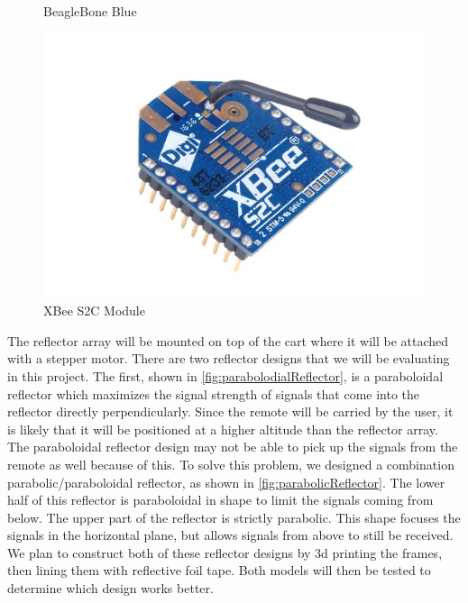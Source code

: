 \begin{figure}
\begin{minipage}[t]{0.32\textwidth}
    \captionsetup{width=\textwidth}
    \caption{BeagleBone Blue}
    \label{fig:beagleboneBlue}
  \end{minipage}
  \begin{minipage}[t]{0.32\textwidth}
    \includegraphics[width=1\textwidth]{figs/img/Xbee-S2C-Module}
    \captionsetup{width=\textwidth}
    \caption{XBee S2C Module}
    \label{fig:XBeeModule}
  \end{minipage}
\end{figure}

\vspace*{12pt}
\noindent
The reflector array will be mounted on top of the cart where it will be attached with a stepper motor. There are two reflector designs that we will be evaluating in this project. The first, shown in \autoref{fig:parabolodialReflector}, is a paraboloidal reflector which maximizes the signal strength of signals that come into the reflector directly perpendicularly. Since the remote will be carried by the user, it is likely that it will be positioned at a higher altitude than the reflector array. The paraboloidal reflector design may not be able to pick up the signals from the remote as well because of this. To solve this problem, we designed a combination parabolic/paraboloidal reflector, as shown in \autoref{fig:parabolicReflector}. The lower half of this reflector is paraboloidal in shape to limit the signals coming from below. The upper part of the reflector is strictly parabolic. This shape focuses the signals in the horizontal plane, but allows signals from above to still be received. We plan to construct both of these reflector designs by 3d printing the frames, then lining them with reflective foil tape. Both models will then be tested to determine which design works better.

